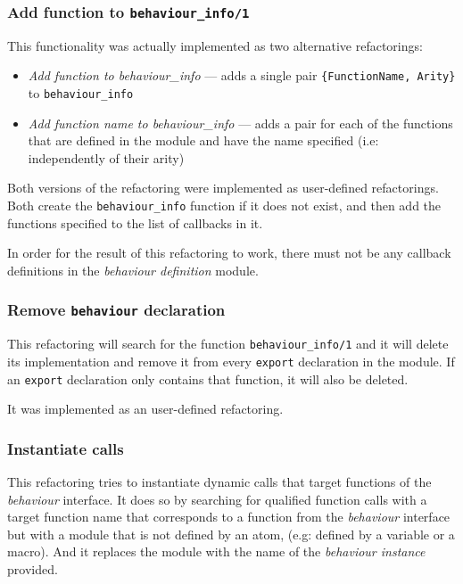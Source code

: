 \subsubsection{Add function to \texttt{behaviour\_info/1}\label{sub:add_callback}}

This functionality was actually implemented as two alternative refactorings:
\begin{itemize}
\item \emph{Add function to behaviour\_info} --- adds a single pair \texttt{\{FunctionName,
Arity\}} to \texttt{behaviour\_info}
\item \emph{Add function name to behaviour\_info} --- adds a pair for each
of the functions that are defined in the module and have the name
specified (i.e: independently of their arity)
\end{itemize}
Both versions of the refactoring were implemented as user-defined
refactorings. Both create the \texttt{behaviour\_info} function if
it does not exist, and then add the functions specified to the list
of callbacks in it.

In order for the result of this refactoring to work, there must not
be any callback definitions in the \emph{behaviour definition} module.


\subsubsection{Remove \texttt{behaviour} declaration\label{sub:remove_behav_dec}}

This refactoring will search for the function \texttt{behaviour\_info/1}
and it will delete its implementation and remove it from every \texttt{export}
declaration in the module. If an \texttt{export} declaration only
contains that function, it will also be deleted.

It was implemented as an user-defined refactoring.


\subsubsection{Instantiate calls\label{sub:instantiate_calls}}

This refactoring tries to instantiate dynamic calls that target functions
of the \emph{behaviour} interface. It does so by searching for qualified
function calls with a target function name that corresponds to a function
from the \emph{behaviour} interface but with a module that is not
defined by an atom, (e.g: defined by a variable or a macro). And it
replaces the module with the name of the \emph{behaviour instance}
provided.

